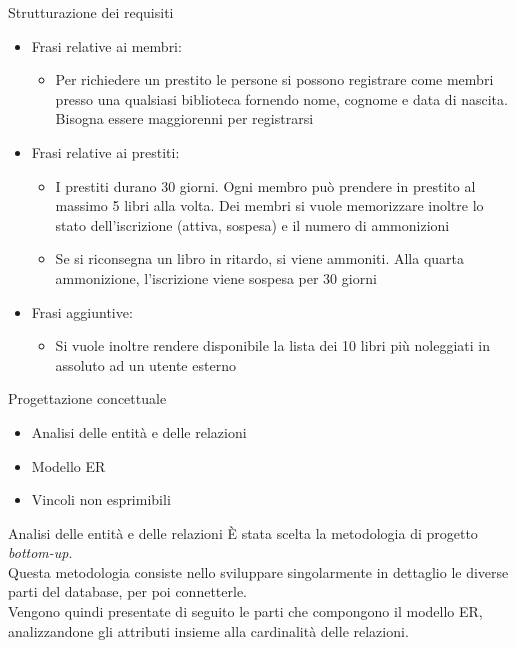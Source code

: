 \begin{frame}{Strutturazione dei requisiti}
    \begin{itemize}
        \item Frasi relative ai membri:
            \begin{itemize}
                \item Per richiedere un prestito le persone si possono registrare come membri presso una qualsiasi biblioteca fornendo nome, cognome e data di nascita. Bisogna essere maggiorenni per registrarsi
            \end{itemize}
        \item Frasi relative ai prestiti:
            \begin{itemize}
                \item I prestiti durano 30 giorni. Ogni membro può prendere in prestito al massimo 5 libri alla volta. Dei membri si vuole memorizzare inoltre lo stato dell'iscrizione (attiva, sospesa) e il numero di ammonizioni

                \item Se si riconsegna un libro in ritardo, si viene ammoniti. Alla quarta ammonizione, l'iscrizione viene sospesa per 30 giorni
            \end{itemize}
        \item Frasi aggiuntive:
            \begin{itemize}
                \item Si vuole inoltre rendere disponibile la lista dei 10 libri più noleggiati in assoluto ad un utente esterno
            \end{itemize}
    \end{itemize}
\end{frame}

\begin{frame}{Progettazione concettuale}
    \begin{itemize}
        \item Analisi delle entità e delle relazioni
        \item Modello ER
        \item Vincoli non esprimibili
    \end{itemize}
\end{frame}

\begin{frame}{Analisi delle entità e delle relazioni}
    È stata scelta la metodologia di progetto \emph{bottom-up}. \\

    Questa metodologia consiste nello sviluppare singolarmente in dettaglio le diverse parti del database, per poi connetterle. \\

    Vengono quindi presentate di seguito le parti che compongono il modello ER, analizzandone gli attributi insieme alla cardinalità delle relazioni.
\end{frame}

